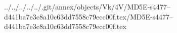 ../../../../../.git/annex/objects/Vk/4V/MD5E-s4477--d441ba7e3c8a10c63dd7558c79ecc00f.tex/MD5E-s4477--d441ba7e3c8a10c63dd7558c79ecc00f.tex